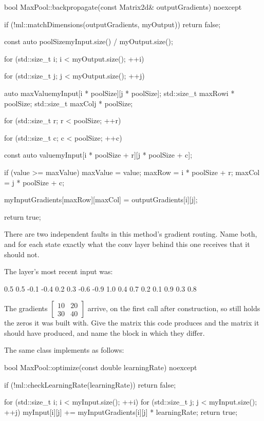 \begin{cppcode}
bool MaxPool::backpropagate(const Matrix2d& outputGradients) noexcept
{
    if (!ml::matchDimensions(outputGradients, myOutput)) { return false; }

    const auto poolSize{myInput.size() / myOutput.size()};

    for (std::size_t i{}; i < myOutput.size(); ++i)
    {
        for (std::size_t j{}; j < myOutput.size(); ++j)
        {
            auto maxValue{myInput[i * poolSize][j * poolSize]};
            std::size_t maxRow{i * poolSize};
            std::size_t maxCol{j * poolSize};

            for (std::size_t r{}; r < poolSize; ++r)
            {
                for (std::size_t c{}; c < poolSize; ++c)
                {
                    const auto value{myInput[i * poolSize + r][j * poolSize + c]};

                    if (value >= maxValue)
                    {
                        maxValue = value;
                        maxRow   = i * poolSize + r;
                        maxCol   = j * poolSize + c;
                    }
                }
            }
            myInputGradients[maxRow][maxCol] = outputGradients[i][j];
        }
    }
    return true;
}
\end{cppcode}

 There are two independent faults in this method's gradient routing. Name both, and for
each state exactly what the conv layer behind this one receives that it should not. 

 The layer's most recent  input was:

\begin{console}
 0.5   0.5  -0.1  -0.4
 0.2   0.3  -0.6  -0.9
 1.0   0.4   0.7   0.2
 0.1   0.9   0.3   0.8
\end{console}

\noindent The gradients $\begin{bmatrix} 10 & 20 \\ 30 & 40 \end{bmatrix}$ arrive, on the first call
after construction, so  still holds the zeros it was built with. Give the
matrix this code produces and the matrix it should have produced, and name the block in which they
differ. 

 The same class implements  as follows:

\begin{cppcode}
bool MaxPool::optimize(const double learningRate) noexcept
{
    if (!ml::checkLearningRate(learningRate)) { return false; }

    for (std::size_t i{}; i < myInput.size(); ++i)
    {
        for (std::size_t j{}; j < myInput.size(); ++j)
        {
            myInput[i][j] += myInputGradients[i][j] * learningRate;
        }
    }
    return true;
}
\end{cppcode}

